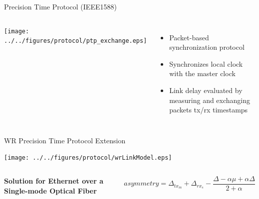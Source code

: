 \documentclass[compress,red]{beamer}
\begin{document}
\begin{frame}{Precision Time Protocol (IEEE1588)}

\begin{columns}[c]
  \column{1.5in}
      \begin{center}
	\texttt{[image: ../../figures/protocol/ptp\_exchange.eps]}
      \end{center}
  \column{2.5in}
      \begin{itemize}
	  \item Packet-based synchronization protocol
	  \item Synchronizes local clock with the master clock
	  \item Link delay evaluated by measuring and exchanging packets tx/rx timestamps
      \end{itemize}
  \end{columns}
\end{frame}
\begin{frame}{WR Precision Time Protocol Extension}

  \begin{center}
  \texttt{[image: ../../figures/protocol/wrLinkModel.eps]}
  \end{center}

  \begin{columns}[c]
  \column{1.5in}

    \begin{center}
      \textbf{Solution for Ethernet over a Single-mode Optical Fiber}
    \end{center}    

  \column{2.7in}

    \begin{equation}
      \nonumber asymmetry = \Delta_{tx_m} + \Delta_{rx_s} - \frac{\Delta - \alpha \mu + \alpha \Delta}{2 + \alpha}
    \end{equation}

  \end{columns}

\end{frame}
\end{document}
